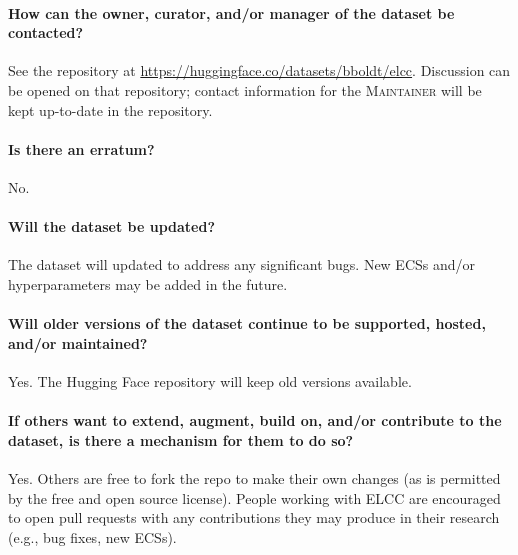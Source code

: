 \documentclass{article}
\newcommand\M{\textsc{Maintainer}}
\begin{document}
\paragraph{How can the owner, curator, and/or manager of the dataset be contacted?}
See the repository at \url{https://huggingface.co/datasets/bboldt/elcc}.
Discussion can be opened on that repository; contact information for the \M{} will be kept up-to-date in the repository.

\paragraph{Is there an erratum?}
No.

\paragraph{Will the dataset be updated?}
The dataset will updated to address any significant bugs.
New ECSs and/or hyperparameters may be added in the future.


\paragraph{Will older versions of the dataset continue to be supported, hosted, and/or maintained?}
Yes.
The Hugging Face repository will keep old versions available.

\paragraph{If others want to extend, augment, build on, and/or contribute to the dataset, is there a mechanism for them to do so?}
Yes.
Others are free to fork the repo to make their own changes (as is permitted by the free and open source license).
People working with ELCC are encouraged to open pull requests with any contributions they may produce in their research (e.g., bug fixes, new ECSs).

\end{document}
